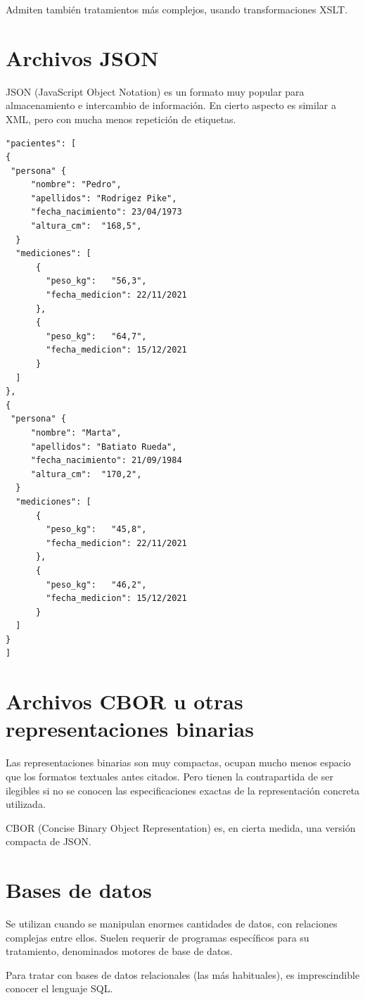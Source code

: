 \documentclass[spanish,12pt,a4paper,final,oneside]{book}
\begin{document}
Admiten también tratamientos más complejos, usando transformaciones XSLT.

\section{Archivos JSON}
JSON (JavaScript Object Notation) es un formato muy popular para almacenamiento e intercambio de información. En cierto aspecto es similar a XML, pero con mucha menos repetición de etiquetas.

\begin{lstlisting}[frame=single, basicstyle=\scriptsize]
"pacientes": [
{
 "persona" {
     "nombre": "Pedro",
     "apellidos": "Rodrigez Pike",
     "fecha_nacimiento": 23/04/1973
     "altura_cm":  "168,5",
  }
  "mediciones": [
      {
        "peso_kg":   "56,3",
        "fecha_medicion": 22/11/2021
      },
      {
        "peso_kg":   "64,7",
        "fecha_medicion": 15/12/2021
      }
  ]
},
{
 "persona" {
     "nombre": "Marta",
     "apellidos": "Batiato Rueda",
     "fecha_nacimiento": 21/09/1984
     "altura_cm":  "170,2",
  }
  "mediciones": [
      {
        "peso_kg":   "45,8",
        "fecha_medicion": 22/11/2021
      },
      {
        "peso_kg":   "46,2",
        "fecha_medicion": 15/12/2021
      }
  ]
}
]  
\end{lstlisting}



\section{Archivos CBOR u otras representaciones binarias}
Las representaciones binarias son muy compactas, ocupan mucho menos espacio que los formatos textuales antes citados. Pero tienen la contrapartida de ser  ilegibles si no se conocen las especificaciones exactas de la representación concreta utilizada.

CBOR (Concise Binary Object Representation) es, en cierta medida, una versión compacta de JSON.

\section{Bases de datos}
Se utilizan cuando se manipulan enormes cantidades de datos, con relaciones complejas entre ellos. Suelen requerir de programas específicos para su tratamiento, denominados motores de base de datos.

Para tratar con bases de datos relacionales (las más habituales), es imprescindible conocer el lenguaje SQL. 
\end{document}
